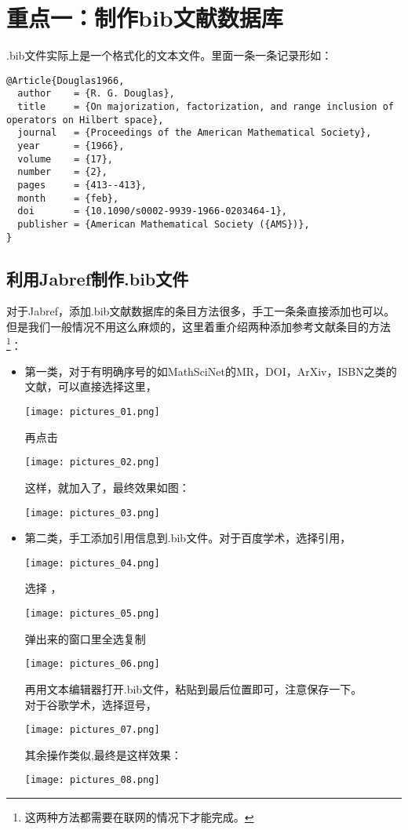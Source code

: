 \documentclass[cn,geye,cyan,normal,14pt]{elegantnote}
\begin{document}
\section{重点一：制作bib文献数据库}
.bib文件实际上是一个格式化的文本文件。里面一条一条记录形如：
\begin{lstlisting}
@Article{Douglas1966,
  author    = {R. G. Douglas},
  title     = {On majorization, factorization, and range inclusion of operators on Hilbert space},
  journal   = {Proceedings of the American Mathematical Society},
  year      = {1966},
  volume    = {17},
  number    = {2},
  pages     = {413--413},
  month     = {feb},
  doi       = {10.1090/s0002-9939-1966-0203464-1},
  publisher = {American Mathematical Society ({AMS})},
}
\end{lstlisting}
\subsection{利用Jabref制作.bib文件}
	对于Jabref，添加.bib文献数据库的条目方法很多，手工一条条直接添加也可以。但是我们一般情况不用这么麻烦的，这里着重介绍两种添加参考文献条目的方法\footnote{这两种方法都需要在联网的情况下才能完成。}：
	\begin{itemize}
		\item 第一类，对于有明确序号的如MathSciNet的MR，DOI，ArXiv，ISBN之类的文献，可以直接选择这里，
			\begin{center}
				\texttt{[image: pictures\_01.png]}
			\end{center}
			再点击
			\begin{center}
				\texttt{[image: pictures\_02.png]}
			\end{center}
			这样，就加入了，最终效果如图：
			\begin{center}
			\texttt{[image: pictures\_03.png]}
			\end{center}
		\item 第二类，手工添加引用信息到.bib文件。对于百度学术，选择引用，
			\begin{center}
			\texttt{[image: pictures\_04.png]}
			\end{center}
			选择 \BibTeX，
			\begin{center}
			\texttt{[image: pictures\_05.png]}
			\end{center}
			弹出来的窗口里全选复制
			\begin{center}
			\texttt{[image: pictures\_06.png]}
			\end{center}
			再用文本编辑器打开.bib文件，粘贴到最后位置即可，注意保存一下。\\
对于谷歌学术，选择逗号，
			\begin{center}
			\texttt{[image: pictures\_07.png]}
			\end{center}
			其余操作类似,最终是这样效果：
			\begin{center}
			\texttt{[image: pictures\_08.png]}
			\end{center}
	\end{itemize}
\end{document}
